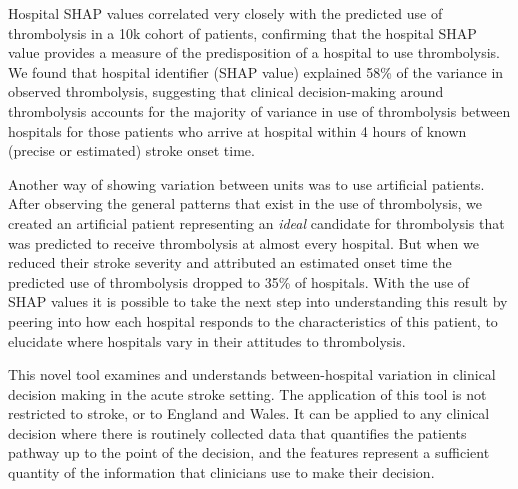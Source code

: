 Hospital SHAP values correlated very closely with the predicted use of thrombolysis in a 10k cohort of patients, confirming that the hospital SHAP value provides a measure of the predisposition of a hospital to use thrombolysis. We found that hospital identifier (SHAP value) explained 58\% of the variance in observed thrombolysis, suggesting that clinical decision-making around thrombolysis accounts for the majority of variance in use of thrombolysis between hospitals for those patients who arrive at hospital within 4 hours of known (precise or estimated) stroke onset time. 

\iffalse
THIS REFERS TO SUBGROUP ANALYSIS THAT WE REMOVED

After observing the general patterns that exist in the use of thrombolysis, we created subgroups of patients based reflecting what appeared to be an \emph{ideal} candidate for thrombolysis, and also for subgroups where we expected to see lower use of thrombolysis (low stroke severity, no precise onset time, pre-stroke disability). Observed thrombolysis in these groups reflected the patterns identified by the SHAP analysis. For the \emph{ideal} candidates of thrombolysis, half of stroke units would give thrombolysis to at least 90\% of these patients, but some units gave it to significantly fewer patients. Use of thrombolysis in the other subgroups of patients was, as expected, lower, but use also varied significantly, with use ranging between 0\% and 40\% for these less ideal patients. These patterns, both of average use, but also range of use between hospitals, were repeated with expected use of thrombolysis in the same 10k patient cohort of patients.
\fi

Another way of showing variation between units was to use artificial patients. After observing the general patterns that exist in the use of thrombolysis, we created an artificial patient representing an \emph{ideal} candidate for thrombolysis that was predicted to receive thrombolysis at almost every hospital. But when we reduced their stroke severity and attributed an estimated onset time the predicted use of thrombolysis dropped to 35\% of hospitals. With the use of SHAP values it is possible to take the next step into understanding this result by peering into how each hospital responds to the characteristics of this patient, to elucidate where hospitals vary in their attitudes to thrombolysis.

This novel tool examines and understands between-hospital variation in clinical decision making in the acute stroke setting. The application of this tool is not restricted to stroke, or to England and Wales. It can be applied to any clinical decision where there is routinely collected data that quantifies the patients pathway up to the point of the decision, and the features represent a sufficient quantity of the information that clinicians use to make their decision.

